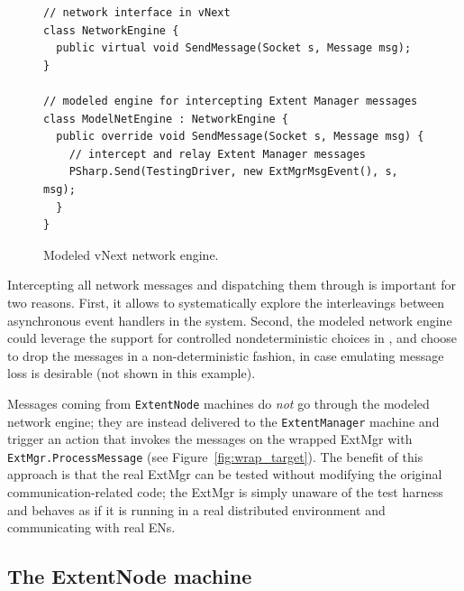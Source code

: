 \begin{figure}[t]
\begin{lstlisting}
// network interface in vNext
class NetworkEngine {
  public virtual void SendMessage(Socket s, Message msg);
}

// modeled engine for intercepting Extent Manager messages
class ModelNetEngine : NetworkEngine {
  public override void SendMessage(Socket s, Message msg) {
    // intercept and relay Extent Manager messages
    PSharp.Send(TestingDriver, new ExtMgrMsgEvent(), s, msg);
  }
}
\end{lstlisting}
\vspace{-5mm}
\caption{Modeled vNext network engine.}
\label{fig:enginecode}
\vspace{-3mm}
\end{figure}

Intercepting all network messages and dispatching them through \psharp is important for two reasons. First, it allows \psharp to systematically explore the interleavings between asynchronous event handlers in the system. Second, the modeled network engine could leverage the support for controlled nondeterministic choices in \psharp, and choose to drop the messages in a non-deterministic fashion, in case emulating message loss is desirable (not shown in this example).

Messages coming from \texttt{ExtentNode} machines do \emph{not} go through the modeled network engine; they are instead delivered to the \texttt{ExtentManager} machine and trigger an action that invokes the messages on the wrapped ExtMgr with \texttt{ExtMgr.ProcessMessage} (see Figure~\ref{fig:wrap_target}). The benefit of this approach is that the real ExtMgr can be tested without modifying the original communication-related code; the ExtMgr is simply unaware of the \psharp test harness and behaves as if it is running in a real distributed environment and communicating with real ENs.

\subsection{The ExtentNode machine}
\label{sec:method:model_en}

